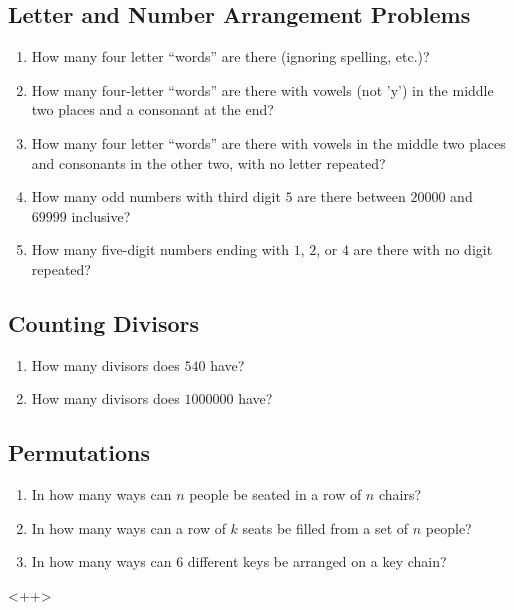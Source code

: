 \documentclass[twocolumn]{article}
\begin{document}
\subsection*{Letter and Number Arrangement Problems}
\begin{enumerate}
	\item How many four letter ``words'' are there (ignoring spelling, etc.)?
		\vspace{3cm}
	\item How many four-letter ``words'' are there with vowels (not 'y') in the 
		middle two places and a consonant at the end?
		\vspace{3cm}
	\item How many four letter ``words'' are there with vowels in the middle two 
		places and consonants in the other two, with no letter repeated?
		\vspace{3cm}
	\item How many odd numbers with third digit $5$ are there between $20000$ 
		and $69999$ inclusive?
		\vspace{3cm}
	\item How many five-digit numbers ending with $1$, $2$, or $4$ are there 
		with no digit repeated?
		\vspace{3cm}
\end{enumerate}

\subsection*{Counting Divisors}
\begin{enumerate}[resume]
	\item How many divisors does $540$ have?
		\vspace{3cm}
	\item How many divisors does $\num{1000000}$ have?
		\vspace{3cm}
\end{enumerate}

\subsection*{Permutations}
\begin{enumerate}[resume]
	\item In how many ways can $n$ people be seated in a row of $n$ chairs?
		\vspace{3cm}
	\item In how many ways can a row of $k$ seats be filled from a set of $n$ 
		people?
		\vspace{3cm}
	\item In how many ways can $6$ different keys be arranged on a key chain?
		\vspace{3cm}
\end{enumerate}<++>
\end{document}
